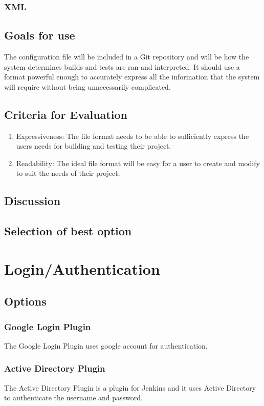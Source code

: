 \documentclass[10pt,letterpaper,onecolumn,journal]{IEEEtran}
\begin{document}
\subsubsection{XML}
\subsection{Goals for use}
The configuration file will be included in a Git repository and will be how the system determines builds and tests are ran and interpreted. It should use a format powerful enough to accurately express all the information that the system will require without being unnecessarily complicated.
\subsection{Criteria for Evaluation}
\begin{enumerate}
  \item Expressiveness: The file format needs to be able to sufficiently express the users needs for building and testing their project.
  \item Readability: The ideal file format will be easy for a user to create and modify to suit the needs of their project.
\end{enumerate}
\subsection{Discussion}
\subsection{Selection of best option}

\section{Login/Authentication}
\subsection{Options}
\subsubsection{Google Login Plugin}
The Google Login Plugin uses google account for authentication.
\subsubsection{Active Directory Plugin}
The Active Directory Plugin is a plugin for Jenkins and it uses Active Directory to authenticate the username and password.
\end{document}
